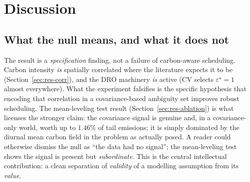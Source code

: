 \documentclass[12pt]{article}
\begin{document}
\section{Discussion}\label{sec:discussion}

\subsection{What the null means, and what it does not}
The result is a \emph{specification} finding, not a failure of carbon-aware
scheduling. Carbon intensity \emph{is} spatially correlated where the literature
expects it to be (Section~\ref{sec:res-corr}), and the DRO machinery \emph{is}
active (CV selects $\varepsilon^\star=1$ almost everywhere). What the experiment
falsifies is the specific hypothesis that encoding that correlation in a
covariance-based ambiguity set improves robust scheduling. The mean-leveling test
result (Section~\ref{sec:res-ablation}) is what licenses the stronger claim: the
covariance signal is genuine and, in a covariance-only world, worth up to
$1.46\%$ of tail emissions; it is simply dominated by the diurnal mean carbon
field in the problem as actually posed. A reader could otherwise dismiss the null
as ``the data had no signal''; the mean-leveling test shows the signal is present but
\emph{subordinate}. This is the central intellectual contribution: a clean
separation of \emph{validity} of a modelling assumption from its \emph{value}.
\end{document}

